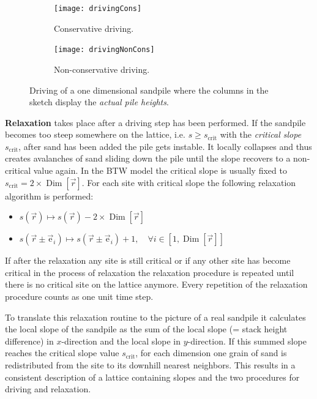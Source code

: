 \begin{figure}[htb]
    \centering
    \begin{subfigure}{0.48\linewidth}
        \texttt{[image: drivingCons]}
        \caption{Conservative driving.}
        \label{fig:driving:cons}
    \end{subfigure}
    \begin{subfigure}{0.48\linewidth}
        \texttt{[image: drivingNonCons]}
        \caption{Non-conservative driving.}
        \label{fig:driving:non-cons}
    \end{subfigure}
    \caption{Driving of a one dimensional sandpile where the columns in the sketch display
             the \emph{actual pile heights}.}
    \label{fig:driving}
\end{figure}

\textbf{Relaxation} takes place after a driving step has been performed. If the sandpile becomes too steep somewhere on the
lattice, i.e. $s \geq s_{\mathrm{crit}}$ with the \emph{critical slope} $s_{\mathrm{crit}}$, after sand has been added
the pile gets instable. It locally collapses and thus creates avalanches of sand sliding down the pile until the slope
recovers to a non-critical value again. In the BTW model the critical slope is usually fixed to
$s_{\mathrm{crit}}=2\times\operatorname{Dim}\left[\vec{r}\right]$. For each site with critical slope the following
relaxation algorithm is performed:
\begin{itemize}
\item $s(\vec{r}) \mapsto s(\vec{r}) - 2\times\operatorname{Dim}\left[\vec{r}\right]$
\item $s(\vec{r}\pm\vec{\mathrm{e}}_i) \mapsto s(\vec{r}\pm\vec{\mathrm{e}}_i) + 1,
\quad \forall i\in[1,\operatorname{Dim}\left[\vec{r}\right]]$
\end{itemize}
If after the relaxation any site is still critical or if any other site has become critical in the process of
relaxation the relaxation procedure is repeated until there is no critical site on the lattice anymore.
Every repetition of the relaxation procedure counts as one unit time step.

To translate this relaxation routine to the picture of a real sandpile it calculates the local slope of the sandpile as
the sum of the local slope (= stack height difference) in $x$-direction and the local slope in $y$-direction.
If this summed slope reaches the critical slope value $s_{\mathrm{crit}}$, for each dimension one grain of sand is
redistributed from the site to its downhill nearest neighbors. This results in a consistent description of a lattice
containing slopes and the two procedures for driving and relaxation.

